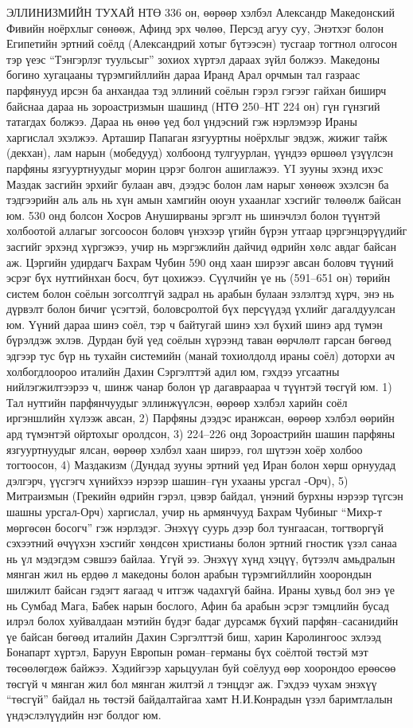 ЭЛЛИНИЗМИЙН ТУХАЙ
НТӨ 336 он, өөрөөр хэлбэл Александр Македонский Фивийн ноёрхлыг сөнөөж, Афинд эрх чөлөө, Персэд агуу суу, Энэтхэг болон Египетийн эртний соёлд (Александрий хотыг бүтээсэн) тусгаар тогтнол олгосон тэр үеэс “Тэнгэрлэг туульсыг” зохиох хүртэл дараах зүйл болжээ.
Македоны богино хугацааны түрэмгийллийн дараа Иранд Арал орчмын тал газраас парфянууд ирсэн ба анхандаа тэд эллиний соёлын гэрэл гэгээг гайхан биширч байснаа дараа нь зороастризмын шашинд (НТӨ 250–НТ 224 он) гүн гүнзгий татагдах болжээ. Дараа нь өнөө үед бол үндэсний гэж нэрлэмээр Ираны харгислал эхэлжээ. Арташир Папаган язгууртны ноёрхлыг эвдэж, жижиг тайж (декхан), лам нарын (мобедууд) холбоонд тулгуурлан, үүндээ өршөөл үзүүлсэн парфяны язгууртнуудыг морин цэрэг болгон ашиглажээ.
YI зууны эхэнд ихэс Маздак засгийн эрхийг булаан авч, дээдэс болон лам нарыг хөнөөж эхэлсэн ба тэдгээрийн аль аль нь хүн амын хамгийн оюун ухаанлаг хэсгийг төлөөлж байсан юм. 530 онд болсон Хосров Ануширваны эргэлт нь шинэчлэл болон түүнтэй холбоотой аллагыг зогсоосон боловч үнэхээр үгийн бүрэн утгаар цэргэнцэрүүдийг засгийг эрхэнд хүргэжээ, учир нь мэргэжлийн дайчид өдрийн хөлс авдаг байсан аж. Цэргийн удирдагч Бахрам Чубин 590 онд хаан ширээг авсан боловч түүний эсрэг бүх нутгийнхан босч, бут цохижээ.
Сүүлчийн үе нь (591–651 он) төрийн систем болон соёлын зогсолтгүй задрал нь арабын булаан эзлэлтэд хүрч, энэ нь дүрвэлт болон бичиг үсэгтэй, боловсролтой бүх персүүдэд үхлийг дагалдуулсан юм. Үүний дараа шинэ соёл, тэр ч байтугай шинэ хэл бүхий шинэ ард түмэн бүрэлдэж эхлэв.
Дурдан буй үед соёлын хүрээнд таван өөрчлөлт гарсан бөгөөд эдгээр тус бүр нь тухайн системийн (манай тохиолдолд ираны соёл) доторхи ач холбогдлоороо италийн Дахин Сэргэлттэй адил юм, гэхдээ угсаатны нийлэгжилтээрээ ч, шинж чанар болон үр дагавраараа ч түүнтэй төсгүй юм. 1) Тал нутгийн парфянчуудыг эллинжүүлсэн, өөрөөр хэлбэл харийн соёл иргэншлийн хүлээж авсан, 2) Парфяны дээдэс иранжсан, өөрөөр хэлбэл өөрийн ард түмэнтэй ойртохыг оролдсон, 3) 224–226 онд Зороастрийн шашин парфяны язгууртнуудыг ялсан, өөрөөр хэлбэл хаан ширээ, гол шүтээн хоёр холбоо тогтоосон, 4) Маздакизм (Дундад зууны эртний үед Иран болон хөрш орнуудад дэлгэрч, үүсгэгч хүнийхээ нэрээр шашин–гүн ухааны урсгал -Орч), 5) Митраизмын (Грекийн өдрийн гэрэл, цэвэр байдал, үнэний бурхны нэрээр түгсэн шашны урсгал-Орч) харгислал, учир нь армянчууд Бахрам Чубиныг “Михр-т мөргөсөн босогч” гэж нэрлэдэг. Энэхүү суурь дээр бол тунгаасан, тогтворгүй сэхээтний өчүүхэн хэсгийг хөндсөн христианы болон эртний гностик үзэл санаа нь үл мэдэгдэм сэвшээ байлаа.
Үгүй ээ. Энэхүү хүнд хэцүү, бүтээлч амьдралын мянган жил нь ердөө л македоны болон арабын түрэмгийллийн хоорондын шилжилт байсан гэдэгт яагаад ч итгэж чадахгүй байна. Ираны хувьд бол энэ үе нь Сумбад Мага, Бабек нарын бослого, Афин ба арабын эсрэг тэмцлийн бусад илрэл болох хуйвалдаан мэтийн бүдэг бадаг дурсамж бүхий парфян–сасанидийн үе байсан бөгөөд италийн Дахин Сэргэлттэй биш, харин Каролингоос эхлээд Бонапарт хүртэл, Баруун Европын роман–германы бүх соёлтой төстэй мэт төсөөлөгдөж байжээ. Хэдийгээр харьцуулан буй соёлууд өөр хоорондоо ерөөсөө төсгүй ч мянган жил бол мянган жилтэй л тэнцдэг аж. Гэхдээ чухам энэхүү “төсгүй” байдал нь төстэй байдалтайгаа хамт Н.И.Конрадын үзэл баримтлалын үндэслэлүүдийн нэг болдог юм.
